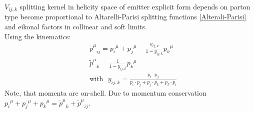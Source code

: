 $ V_{ij,k} $ splitting kernel in helicity space of emitter
explicit form depends on parton type become proportional to Altarelli-Parisi splitting functions \ref{Alterali-Parisi} and eikonal factors
in collinear and soft limits.\\
Using the kinematics:
\begin{equation}
\begin{split}
&{\tilde{p}^{\mu}}_{ij} = {p_i}^{\mu}+{p_j}^{\mu}-\frac{y_{ij,k}}{1-y_{ij,k}}{p_k}^{\mu}\\
&{\tilde{p}^{\mu}}_{k} = \frac{1}{1-y_{ij,k}}{p_k}^{\mu}\\
&\text{with}\:\:\:y_{ij,k}=\frac{p_i \cdot p_j}{p_i \cdot p_j+p_j \cdot p_k+p_k \cdot p_i}
\end{split}
\end{equation}
Note, that momenta are on-shell. Due to momentum conservation ${p_i}^{\mu}+{p_j}^{\mu}+{p_k}^{\mu}= {\tilde{p}^{\mu}}_{k} +{\tilde{p}^{\mu}}_{ij} $. 





\newpage

